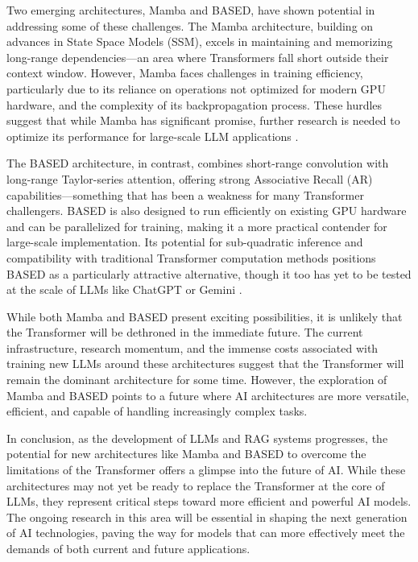 Two emerging architectures, Mamba and BASED, have shown potential in addressing some of these challenges. The Mamba architecture, building on advances in State Space Models (SSM), excels in maintaining and memorizing long-range dependencies—an area where Transformers fall short outside their context window. However, Mamba faces challenges in training efficiency, particularly due to its reliance on operations not optimized for modern GPU hardware, and the complexity of its backpropagation process. These hurdles suggest that while Mamba has significant promise, further research is needed to optimize its performance for large-scale LLM applications \cite{gu2023mamba}.

The BASED architecture, in contrast, combines short-range convolution with long-range Taylor-series attention, offering strong Associative Recall (AR) capabilities—something that has been a weakness for many Transformer challengers. BASED is also designed to run efficiently on existing GPU hardware and can be parallelized for training, making it a more practical contender for large-scale implementation. Its potential for sub-quadratic inference and compatibility with traditional Transformer computation methods positions BASED as a particularly attractive alternative, though it too has yet to be tested at the scale of LLMs like ChatGPT or Gemini \cite{arora2023based}.

While both Mamba and BASED present exciting possibilities, it is unlikely that the Transformer will be dethroned in the immediate future. The current infrastructure, research momentum, and the immense costs associated with training new LLMs around these architectures suggest that the Transformer will remain the dominant architecture for some time. However, the exploration of Mamba and BASED points to a future where AI architectures are more versatile, efficient, and capable of handling increasingly complex tasks.

In conclusion, as the development of LLMs and RAG systems progresses, the potential for new architectures like Mamba and BASED to overcome the limitations of the Transformer offers a glimpse into the future of AI. While these architectures may not yet be ready to replace the Transformer at the core of LLMs, they represent critical steps toward more efficient and powerful AI models. The ongoing research in this area will be essential in shaping the next generation of AI technologies, paving the way for models that can more effectively meet the demands of both current and future applications.

